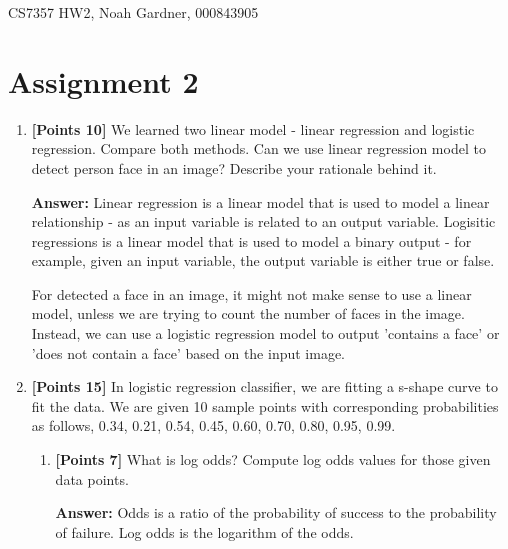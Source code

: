 \documentclass[12pt]{article}
\begin{document}
CS7357 HW2, Noah Gardner, 000843905\newline

\section{Assignment 2}
\begin{enumerate}
      \item \textbf{[Points 10]} We learned two linear model - linear regression
            and logistic regression. Compare both methods. Can we use linear
            regression model to detect person face in an image? Describe your
            rationale behind it.

            \textbf{Answer:}
            Linear regression is a linear model that is used to model a linear
            relationship - as an input variable is related to an output variable.
            Logisitic regressions is a linear model that is used to model a binary
            output - for example, given an input variable, the output variable is
            either true or false.

            For detected a face in an image, it might not make sense to use a
            linear model, unless we are trying to count the number of faces in the
            image. Instead, we can use a logistic regression model to output
            'contains a face' or 'does not contain a face' based on the input
            image.

      \item \textbf{[Points 15]} In logistic regression classifier, we are fitting
            a s-shape curve to fit the data. We are given 10 sample points with
            corresponding probabilities as follows, 0.34, 0.21, 0.54, 0.45, 0.60,
            0.70, 0.80, 0.95, 0.99.

            \begin{enumerate}
                  \item \textbf{[Points 7]} What is log odds? Compute log odds
                        values for those given data points.

                        \textbf{Answer:}
                        Odds is a ratio of the probability of success to the
                        probability of failure. Log odds is the logarithm of the
                        odds.


\end{enumerate}
\end{enumerate}
\end{document}
